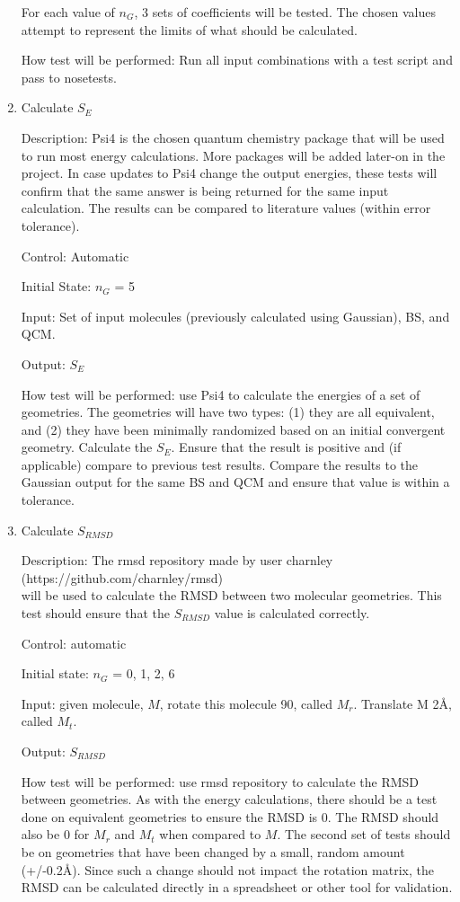 \documentclass[12pt, titlepage]{article}
\begin{document}
\begin{enumerate}
	For each value of $n_G$, 3 sets of coefficients will be tested. The chosen 
	values attempt to represent the limits of what should be calculated.
	
	How test will be performed: Run all input combinations with a test script 
	and pass to nosetests.
	
	\item Calculate $S_E$
	
	Description: Psi4 is the chosen quantum chemistry package that will be used 
	to run most energy calculations. More packages will be added later-on in 
	the project. In case updates to Psi4 change the output energies, these 
	tests will confirm that the same answer is being returned for the same 
	input calculation. The results can be compared to literature values (within 
	error tolerance).

	Control: Automatic

	Initial State: $n_G$ = 5

	Input: Set of input molecules (previously calculated using Gaussian), BS, 
	and QCM.

	Output: $S_E$ 

	How test will be performed: use Psi4 to calculate the energies of a set of 
	geometries. The geometries will have two types: (1) they are all 
	equivalent, and (2) they have been minimally randomized based on an initial 
	convergent geometry. Calculate the $S_E$. Ensure that the result is 
	positive and (if applicable) compare to previous test results. Compare the 
	results to the Gaussian output for the same BS and QCM and ensure that 
	value is within a tolerance.
	
	\item Calculate $S_{RMSD}$
	
	Description: The rmsd repository made by user charnley \\
	(https://github.com/charnley/rmsd)\\ will be used to calculate the RMSD 
	between two molecular geometries. This test should ensure that the 
	$S_{RMSD}$ value is calculated correctly.
	
	Control: automatic
	
	Initial state: $n_G$ = 0, 1, 2, 6
	
	Input: given molecule, $M$, rotate this molecule 90\textdegree, called 
	$M_r$. Translate M 2\si{\angstrom}, called $M_t$. 
	
	Output: $S_{RMSD}$
	
	How test will be performed: use rmsd repository to calculate the RMSD 
	between geometries. As with the energy calculations, there should be a test 
	done on equivalent geometries to ensure the RMSD is 0. The RMSD should also 
	be 0 for $M_r$ and $M_t$ when compared to $M$. The second set of tests 
	should be on geometries that have been changed by a small, random amount 
	(+/-0.2\si{\angstrom}). Since such a change should not impact the rotation 
	matrix, the RMSD can be calculated directly in a spreadsheet or other tool 
	for validation.

	
\end{enumerate}
\end{document}
